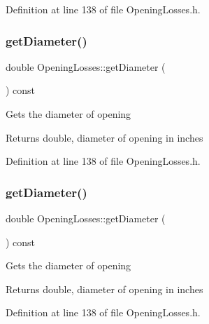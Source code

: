Definition at line 138 of file Opening\+Losses.\+h.

\mbox{\label{class_opening_losses_a8ed643300b0f5b606be6cd669cd413c3}} 
\subsubsection{\texorpdfstring{get\+Diameter()}{getDiameter()}\hspace{0.1cm}{\footnotesize\ttfamily [2/3]}}
{\footnotesize\ttfamily double Opening\+Losses\+::get\+Diameter (\begin{DoxyParamCaption}{ }\end{DoxyParamCaption}) const\hspace{0.3cm}{\ttfamily [inline]}}

Gets the diameter of opening \begin{DoxyReturn}{Returns}
double, diameter of opening in inches 
\end{DoxyReturn}


Definition at line 138 of file Opening\+Losses.\+h.

\mbox{\label{class_opening_losses_a8ed643300b0f5b606be6cd669cd413c3}} 
\subsubsection{\texorpdfstring{get\+Diameter()}{getDiameter()}\hspace{0.1cm}{\footnotesize\ttfamily [3/3]}}
{\footnotesize\ttfamily double Opening\+Losses\+::get\+Diameter (\begin{DoxyParamCaption}{ }\end{DoxyParamCaption}) const\hspace{0.3cm}{\ttfamily [inline]}}

Gets the diameter of opening \begin{DoxyReturn}{Returns}
double, diameter of opening in inches 
\end{DoxyReturn}


Definition at line 138 of file Opening\+Losses.\+h.

\mbox{\label{class_opening_losses_a7eaf8e68f268e8ff1671c5f9f0462b4f}} 

